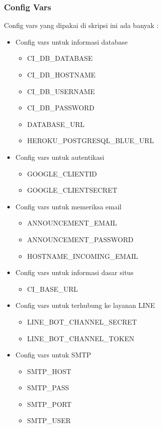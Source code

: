 \subsubsection{Config Vars}
Config vars yang dipakai di skripsi ini ada banyak : 
\begin{itemize}
\item Config vars untuk informasi database 

\begin{itemize}
\item CI\_DB\_DATABASE 
\item CI\_DB\_HOSTNAME 
\item CI\_DB\_USERNAME
\item CI\_DB\_PASSWORD
\item DATABASE\_URL
\item HEROKU\_POSTGRESQL\_BLUE\_URL
\end{itemize}

\item Config vars untuk autentikasi

\begin{itemize}
\item GOOGLE\_CLIENTID 
\item GOOGLE\_CLIENTSECRET
\end{itemize}

\item Config vars untuk memeriksa email

\begin{itemize}
\item ANNOUNCEMENT\_EMAIL 
\item ANNOUNCEMENT\_PASSWORD
\item HOSTNAME\_INCOMING\_EMAIL
\end{itemize}

\item Config vars untuk informasi dasar situs

\begin{itemize}
\item CI\_BASE\_URL
\end{itemize}

\item Config vars untuk terhubung ke layanan LINE

\begin{itemize}
\item LINE\_BOT\_CHANNEL\_SECRET
\item LINE\_BOT\_CHANNEL\_TOKEN
\end{itemize}

\item Config vars untuk SMTP 

\begin{itemize}
\item SMTP\_HOST
\item SMTP\_PASS
\item SMTP\_PORT
\item SMTP\_USER
\end{itemize}

\end{itemize}

